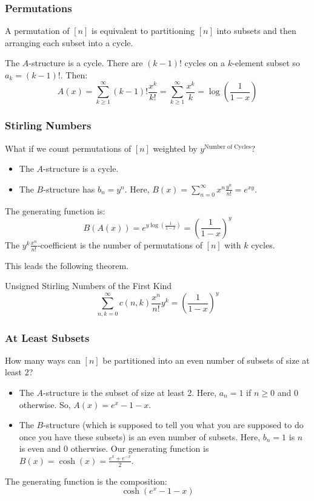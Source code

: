 \documentclass[letterpaper]{article}
\begin{document}
\subsubsection{Permutations}
A permutation of $[n]$ is equivalent to partitioning $[n]$ into subsets and then arranging each subset into a cycle. 

\bigskip 

The $A$-structure is a cycle. There are $(k - 1)!$ cycles on a $k$-element subset so $a_k = (k - 1)!$. Then:
\[A(x) = \sum_{k \geq 1}^{\infty} (k - 1)! \frac{x^k}{k!} = \sum_{k \geq 1}^{\infty} \frac{x^k}{k} = \log\left(\frac{1}{1 - x}\right)\]

\subsubsection{Stirling Numbers}
What if we count permutations of $[n]$ weighted by $y^{\text{Number of Cycles}}$?
\begin{itemize}
    \item The $A$-structure is a cycle. 
    \item The $B$-structure has $b_n = y^n$. Here, $B(x) = \sum_{n = 0}^{\infty} x^n \frac{y^n}{n!} = e^{xy}$. 
\end{itemize}
The generating function is:
\[B(A(x)) = e^{y\log(\frac{1}{1 - x})} = \left(\frac{1}{1 - x}\right)^y\]
The $y^k \frac{x^n}{n!}$-coefficient is the number of permutations of $[n]$ with $k$ cycles.  

\bigskip 

This leads the following theorem.
\begin{theorem}{Unsigned Stirling Numbers of the First Kind}{}
    \[\sum_{n, k = 0}^{\infty} c(n, k) \frac{x^n}{n!} y^k = \left(\frac{1}{1 - x}\right)^y\]
\end{theorem}

\subsubsection{At Least Subsets}
How many ways can $[n]$ be partitioned into an even number of subsets of size at least 2?
\begin{itemize}
    \item The $A$-structure is the subset of size at least 2. Here, $a_n = 1$ if $n \geq 0$ and 0 otherwise. So, $A(x) = e^x - 1 - x$. 
    \item The $B$-structure (which is supposed to tell you what you are supposed to do once you have these subsets) is an even number of subsets. Here, $b_n = 1$ is $n$ is even and 0 otherwise. Our generating function is $B(x) = \cosh(x) = \frac{e^x + e^{-x}}{2}$. 
\end{itemize}
The generating function is the composition:
\[\cosh(e^x - 1 - x)\]
\end{document}
